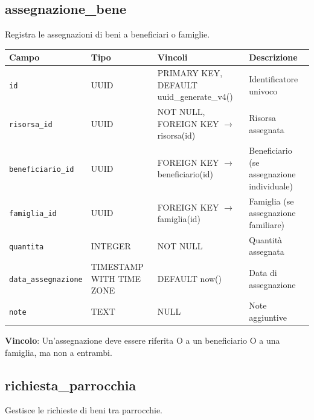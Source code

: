 \documentclass[11pt,a4paper]{article}
\begin{document}
\subsection{assegnazione\_bene}
Registra le assegnazioni di beni a beneficiari o famiglie.

\begin{longtable}{p{3cm}p{3cm}p{4cm}p{5cm}}
\toprule
\textbf{Campo} & \textbf{Tipo} & \textbf{Vincoli} & \textbf{Descrizione} \\
\midrule
\texttt{id} & UUID & PRIMARY KEY, DEFAULT uuid\_generate\_v4() & Identificatore univoco \\
\texttt{risorsa\_id} & UUID & NOT NULL, FOREIGN KEY $\rightarrow$ risorsa(id) & Risorsa assegnata \\
\texttt{beneficiario\_id} & UUID & FOREIGN KEY $\rightarrow$ beneficiario(id) & Beneficiario (se assegnazione individuale) \\
\texttt{famiglia\_id} & UUID & FOREIGN KEY $\rightarrow$ famiglia(id) & Famiglia (se assegnazione familiare) \\
\texttt{quantita} & INTEGER & NOT NULL & Quantità assegnata \\
\texttt{data\_assegnazione} & TIMESTAMP WITH TIME ZONE & DEFAULT now() & Data di assegnazione \\
\texttt{note} & TEXT & NULL & Note aggiuntive \\
\end{longtable}

\textbf{Vincolo}: Un'assegnazione deve essere riferita O a un beneficiario O a una famiglia, ma non a entrambi.

\subsection{richiesta\_parrocchia}
Gestisce le richieste di beni tra parrocchie.
\end{document}
